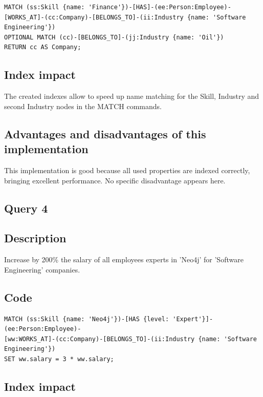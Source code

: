 \documentclass[a4paper, 11pt, titlepage]{article}
\begin{document}
\begin{verbatim}
MATCH (ss:Skill {name: 'Finance'})-[HAS]-(ee:Person:Employee)-
[WORKS_AT]-(cc:Company)-[BELONGS_TO]-(ii:Industry {name: 'Software Engineering'})
OPTIONAL MATCH (cc)-[BELONGS_TO]-(jj:Industry {name: 'Oil'})
RETURN cc AS Company;
\end{verbatim}


\subsection* {Index impact}

\noindent
The created indexes allow to speed up name matching for the Skill, Industry and second Industry nodes in the MATCH commands.


\subsection* {Advantages and disadvantages of this implementation}

\noindent
This implementation is good because all used properties are indexed correctly, bringing excellent performance. No specific disadvantage appears here.


\subsection {Query 4}

\subsection* {Description}

\noindent
Increase by 200\% the salary of all employees experts in 'Neo4j' for 'Software Engineering' companies.


\subsection* {Code}

\begin{verbatim}
MATCH (ss:Skill {name: 'Neo4j'})-[HAS {level: 'Expert'}]-(ee:Person:Employee)-
[ww:WORKS_AT]-(cc:Company)-[BELONGS_TO]-(ii:Industry {name: 'Software Engineering'})
SET ww.salary = 3 * ww.salary;
\end{verbatim}


\subsection* {Index impact}
\end{document}
